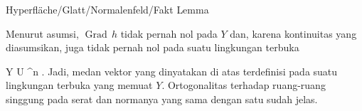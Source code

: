 {Hyperfläche/Glatt/Normalenfeld/Fakt}
{Lemma}
{}
{

\faktzusatz {}
\faktzusatz {}

}
{

Menurut asumsi,
$\operatorname{Grad} \,  h$ tidak pernah nol pada $Y$ dan, karena kontinuitas yang diasumsikan, juga tidak pernah nol pada suatu lingkungan terbuka

\mavergleichskette
{\vergleichskette
{ Y
}
{ \subseteq }{ U
}
{ \subseteq }{ \R^n
}
{    }{
}
{   }{
}
}
{}{}{.}
Jadi, medan vektor yang dinyatakan di atas terdefinisi pada suatu lingkungan terbuka yang memuat $Y$. Ortogonalitas terhadap ruang-ruang singgung pada serat dan normanya yang sama dengan satu sudah jelas.

}

